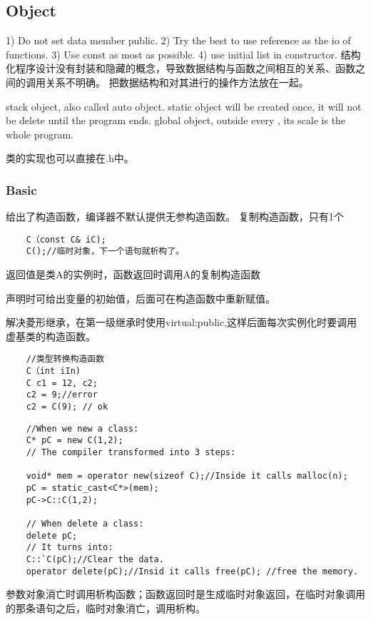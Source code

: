 \documentclass[UTF8]{../computerUniverse}
\begin{document}
\subsection{Object}

1) Do not set data member public.
2) Try the best to use reference as the io of functions.
3) Use const as most as possible.
4) use initial list in constructor.
结构化程序设计没有封装和隐藏的概念，导致数据结构与函数之间相互的关系、函数之间的调用关系不明确。
把数据结构和对其进行的操作方法放在一起。

stack object, also called auto object. 
static object will be created once, it will not be delete until the program ends.
global object, outside every {}, its scale is the whole program.

类的实现也可以直接在.h中。
\subsubsection{Basic}
给出了构造函数，编译器不默认提供无参构造函数。
复制构造函数，只有1个
\begin{lstlisting}
    C（const C& iC);
    C();//临时对象，下一个语句就析构了。
\end{lstlisting}
返回值是类A的实例时，函数返回时调用A的复制构造函数

声明时可给出变量的初始值，后面可在构造函数中重新赋值。


解决菱形继承，在第一级继承时使用virtual:public,这样后面每次实例化时要调用虚基类的构造函数。
\begin{lstlisting}
    //类型转换构造函数
    C（int iIn)
    C c1 = 12, c2;
    c2 = 9;//error
    c2 = C(9); // ok
\end{lstlisting}



\begin{lstlisting}
    //When we new a class: 
    C* pC = new C(1,2);
    // The compiler transformed into 3 steps:

    void* mem = operator new(sizeof C);//Inside it calls malloc(n);
    pC = static_cast<C*>(mem);
    pC->C::C(1,2);

    // When delete a class:
    delete pC;
    // It turns into:
    C::`C(pC);//Clear the data.
    operator delete(pC);//Insid it calls free(pC); //free the memory.
\end{lstlisting}



参数对象消亡时调用析构函数；函数返回时是生成临时对象返回，在临时对象调用的那条语句之后，临时对象消亡，调用析构。
\end{document}
